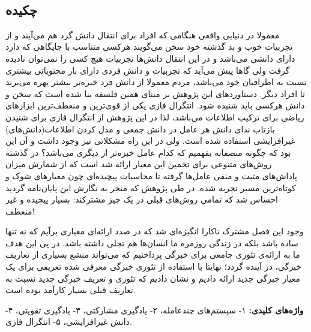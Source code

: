 
\setcounter{page}{1}
\thispagestyle{empty}

~\vfill

\subsection*{چکیده}
\begin{small}
\baselineskip=0.7cm
\vspace*{0.5 cm}

معمولا در دنیایی واقعی هنگامی که افراد برای انتقال دانش گرد هم می‌آیند و از تجربیات خوب و بد گذشته خود سخن می‌گویند هرکسی متناسب با جایگاهی که دارد دارای دانشی می‌باشد و در این انتقال دانش‌ها تجربیات هیچ کسی را نمی‌توان نادیده گرفت ولی گاها پیش می‌آید که تجربیات و دانش فردی دارای بار محتویاتی بیشتری نسبت به اطرافیان خود می‌باشد، مردم معمولا از دانش فرد خبره‌تر بیشتر بهره می‌برند تا افراد دیگر. دستاورد‌های این پژوهش بر مبنای همین فلسفه بنا شده است که سخن و دانش هرکسی باید شنیده شود. انتگرال فازی یکی از قوی‌ترین و منعطف‌ترین ابزارهای ریاضی برای ترکیب اطلاعات می‌باشد، لذا در این پژوهش از انتگرال فازی برای شنیدن بازتاب ندای دانش هر عامل در دانش جمعی و مدل کردن اطلاعات(دانش‌های) غیرافزایشی استفاده شده است. ولی در این راه مشکلاتی نیز وجود داشت و آن این بود که چگونه منصفانه بفهمیم که کدام عامل خبره‌تر از دیگری می‌باشد؟ در گذشته روش‌های متنوعی برای تخمین این معیار ارائه شد است که از شمارش میزان پاداش‌های مثبت و منفی عامل‌ها گرفته تا محاسبات پیچیده‌ای چون معیار‌های شوک و کوتاه‌ترین مسیر تجربه شده. در طی پژوهش که منجر به نگارش این پایان‌نامه گردید احساس شد که تمامی روش‌های قبلی در یک چیز مشترکند: بسیار پیچیده و غیر منعطف!

وجود این فصل مشترک ناکارا انگیزه‌ای شد که در صدد ارائه‌ای معیاری برآیم که نه تنها ساده باشد بلکه در زندگی روزمره ما انسان‌ها هم تجلی داشته باشد. در پی این هدف ما به ارائه‌ی تئوری جامعی برای خبرگی پرداختیم که می‌تواند منشع بسیاری از تعاریف خبرگی، در آینده گردد؛ نهایتا با استفاده از تئوری خبرگی معرفی شده تعریفی برای یک معیار خبرگی جدید ارائه دادیم و نشان دادیم که تئوری و تعریف خبرگی جدید نسبت به تعاریف قبلی بسیار کارآمد بوده است.

\noindent\textbf{واژه‌های کلیدی:}
۱- سیستم‌های چندعامله، ۲- یادگیری مشارکتی، ۳- یادگیری تقویتی، ۴- دانش غیرافزایشی، ۵- انتگرال فازی.
\end{small}